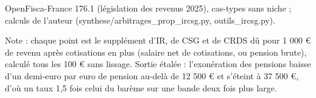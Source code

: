 OpenFisca-France 176.1 (législation des revenus 2025), cas-types sans niche ; calculs de l'auteur (synthese/arbitrages\_prop\_ircsg.py, outils\_ircsg.py).\par Note : chaque point est le supplément d'IR, de CSG et de CRDS dû pour 1 000 \euro{} de revenu après cotisations en plus (salaire net de cotisations, ou pension brute), calculé tous les 100 \euro{} sans lissage. Sortie étalée : l'exonération des pensions baisse d'un demi-euro par euro de pension au-delà de 12 500 \euro{} et s'éteint à 37 500 \euro{}, d'où un taux 1,5 fois celui du barème sur une bande deux fois plus large.
